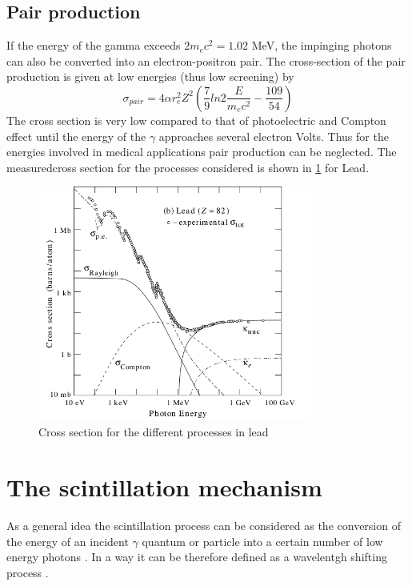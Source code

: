 \subsection{Pair production}

If the energy of the gamma exceeds $2m_{e}c^{2} = 1.02$ MeV, the impinging photons can also be converted into an electron-positron pair. The cross-section of the pair production is given at low energies (thus low screening) by
\begin{equation}
\sigma _{pair} = 4\alpha r_{e}^{2} Z^{2} \left( \frac{7}{9}ln2\frac{E}{m_{e}c^{2}} - \frac{109}{54}\right)
\end{equation}
The cross section is very low compared to that of photoelectric and Compton effect until the energy of the $\gamma$ approaches several electron Volts. Thus for the energies involved in medical applications pair production can be neglected.
The measuredcross section for the processes considered is shown in \ref{fig:cross_section} for Lead. 

\begin{figure}
\centering
\includegraphics[width=9cm]{../Pictures/Chapter_2/sigma_gamma.pdf}
\caption[$\gamma$ cross section]{Cross section for the different processes in lead}
\label{fig:cross_section}
\end{figure}
\newpage
\section{The scintillation mechanism}

As a general idea the scintillation process can be considered as the conversion of the energy of an incident $\gamma$ quantum or particle into a certain number of low energy photons \cite{Rodnyi1997}. In a way it can be therefore defined as a wavelentgh shifting process \cite{Lecoq2006}.

